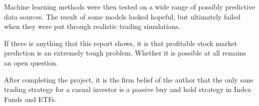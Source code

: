 \documentclass{report}
\begin{document}
Machine learning methods were then tested on a wide range of possibly predictive data sources. The result of some models looked hopeful, but ultimately failed when they were put through realistic trading simulations.

If there is anything that this report shows, it is that profitable stock market prediction is an extremely tough problem. Whether it is possible at all remains an open question. 

After completing the project, it is the firm belief of the author that the only sane trading strategy for a casual investor is a passive buy and hold strategy in Index Funds and ETFs.



\end{document}
